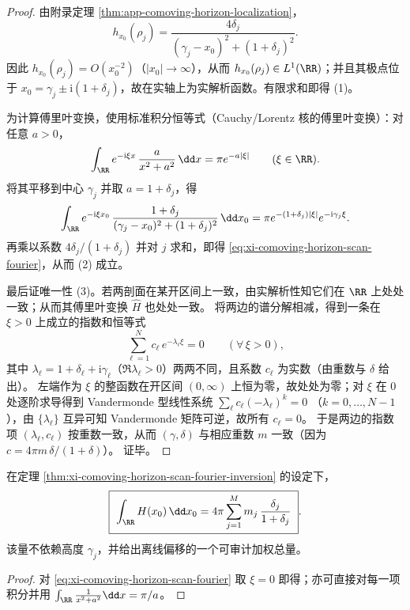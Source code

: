 \begin{proof}
由附录定理 \ref{thm:app-comoving-horizon-localization}，
\[
h_{x_0}(\rho_j)=\frac{4\delta_j}{(\gamma_j-x_0)^2+(1+\delta_j)^2}.
\]
因此 \(h_{x_0}(\rho_j)=O(x_0^{-2})\)（\(|x_0|\to\infty\)），从而 \(h_{x_0}(\rho_j)\in L^1(\RR)\)；并且其极点位于 \(x_0=\gamma_j\pm \mathrm{i}(1+\delta_j)\)，故在实轴上为实解析函数。有限求和即得 (1)。
\par
为计算傅里叶变换，使用标准积分恒等式（Cauchy/Lorentz 核的傅里叶变换）：对任意 \(a>0\)，
\[
\int_{\RR}e^{-\mathrm{i}\xi x}\,\frac{a}{x^2+a^2}\,\dd x
=\pi e^{-a|\xi|}\qquad(\xi\in\RR).
\]
将其平移到中心 \(\gamma_j\) 并取 \(a=1+\delta_j\)，得
\[
\int_{\RR}e^{-\mathrm{i}\xi x_0}\,\frac{1+\delta_j}{(\gamma_j-x_0)^2+(1+\delta_j)^2}\,\dd x_0
=\pi e^{-(1+\delta_j)|\xi|}e^{-\mathrm{i}\gamma_j\xi}.
\]
再乘以系数 \(4\delta_j/(1+\delta_j)\) 并对 \(j\) 求和，即得 \eqref{eq:xi-comoving-horizon-scan-fourier}，从而 (2) 成立。
\par
最后证唯一性 (3)。若两剖面在某开区间上一致，由实解析性知它们在 \(\RR\) 上处处一致；从而其傅里叶变换 \(\widehat H\) 也处处一致。
将两边的谱分解相减，得到一条在 \(\xi>0\) 上成立的指数和恒等式
\[
\sum_{\ell=1}^{N}c_{\ell}\,e^{-\lambda_{\ell}\xi}=0\qquad(\forall\,\xi>0),
\]
其中 \(\lambda_{\ell}=1+\delta_{\ell}+\mathrm{i}\gamma_{\ell}\)（\(\Re\lambda_{\ell}>0\)）两两不同，且系数 \(c_{\ell}\) 为实数（由重数与 \(\delta\) 给出）。
左端作为 \(\xi\) 的整函数在开区间 \((0,\infty)\) 上恒为零，故处处为零；对 \(\xi\) 在 \(0\) 处逐阶求导得到 Vandermonde 型线性系统
\(
\sum_{\ell}c_{\ell}(-\lambda_{\ell})^{k}=0
\)
（\(k=0,\dots,N-1\)），由 \(\{\lambda_{\ell}\}\) 互异可知 Vandermonde 矩阵可逆，故所有 \(c_{\ell}=0\)。
于是两边的指数项 \((\lambda_{\ell},c_{\ell})\) 按重数一致，从而 \((\gamma,\delta)\) 与相应重数 \(m\) 一致（因为 \(c=4\pi m\,\delta/(1+\delta)\)）。
证毕。
\end{proof}

\begin{corollary}\label{cor:xi-comoving-horizon-scan-mass}
在定理 \ref{thm:xi-comoving-horizon-scan-fourier-inversion} 的设定下，
\[
\boxed{\ \int_{\RR}H(x_0)\,\dd x_0
=4\pi\sum_{j=1}^{M} m_j\,\frac{\delta_j}{1+\delta_j}\ }.
\]
该量不依赖高度 \(\gamma_j\)，并给出离线偏移的一个可审计加权总量。
\end{corollary}

\begin{proof}
对 \eqref{eq:xi-comoving-horizon-scan-fourier} 取 \(\xi=0\) 即得；亦可直接对每一项积分并用
\(\int_{\RR}\frac{1}{x^2+a^2}\dd x=\pi/a\)。
\end{proof}

